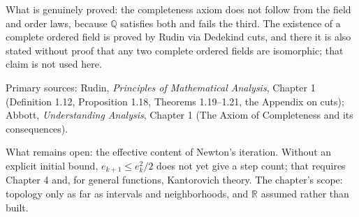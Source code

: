 \begin{untukpeneliti}
What is genuinely proved: the completeness axiom does not follow from the field and
order laws, because $\mathbb{Q}$ satisfies both and fails the third. The existence of a
complete ordered field is proved by Rudin via Dedekind cuts, and there it is also stated
without proof that any two complete ordered fields are isomorphic; that claim is not
used here.

Primary sources: Rudin, \emph{Principles of Mathematical Analysis}, Chapter 1
(Definition 1.12, Proposition 1.18, Theorems 1.19--1.21, the Appendix on cuts); Abbott,
\emph{Understanding Analysis}, Chapter 1 (The Axiom of Completeness and its
consequences).

What remains open: the effective content of Newton's iteration. Without an explicit
initial bound, $e_{k+1}\le e_k^2/2$ does not yet give a step count; that requires
Chapter 4 and, for general functions, Kantorovich theory. The chapter's scope: topology
only as far as intervals and neighborhoods, and $\mathbb{R}$ assumed rather than built.
\end{untukpeneliti}


